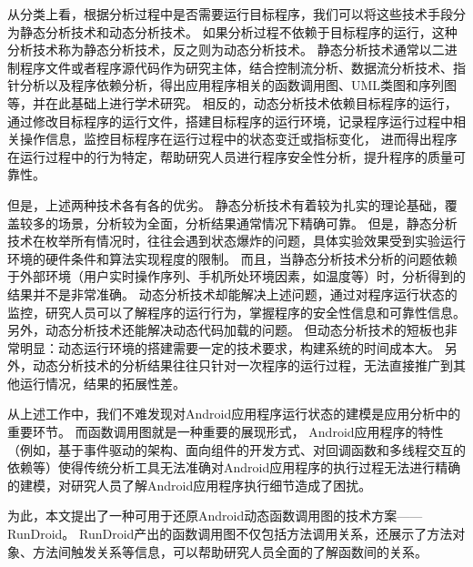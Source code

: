 从分类上看，根据分析过程中是否需要运行目标程序，我们可以将这些技术手段分为静态分析技术和动态分析技术。
如果分析过程不依赖于目标程序的运行，这种分析技术称为静态分析技术，反之则为动态分析技术。
静态分析技术通常以二进制程序文件或者程序源代码作为研究主体，结合控制流分析、数据流分析技术、指针分析以及程序依赖分析，得出应用程序相关的函数调用图、UML类图和序列图等，并在此基础上进行学术研究。
相反的，动态分析技术依赖目标程序的运行，通过修改目标程序的运行文件，搭建目标程序的运行环境，记录程序运行过程中相关操作信息，监控目标程序在运行过程中的状态变迁或指标变化，
进而得出程序在运行过程中的行为特定，帮助研究人员进行程序安全性分析，提升程序的质量可靠性。




但是，上述两种技术各有各的优劣。
静态分析技术有着较为扎实的理论基础，覆盖较多的场景，分析较为全面，分析结果通常情况下精确可靠。
但是，静态分析技术在枚举所有情况时，往往会遇到状态爆炸的问题，具体实验效果受到实验运行环境的硬件条件和算法实现程度的限制。
而且，当静态分析技术分析的问题依赖于外部环境（用户实时操作序列、手机所处环境因素，如温度等）时，分析得到的结果并不是非常准确。
动态分析技术却能解决上述问题，通过对程序运行状态的监控，研究人员可以了解程序的运行行为，掌握程序的安全性信息和可靠性信息。
另外，动态分析技术还能解决动态代码加载的问题。
但动态分析技术的短板也非常明显：动态运行环境的搭建需要一定的技术要求，构建系统的时间成本大。
另外，动态分析技术的分析结果往往只针对一次程序的运行过程，无法直接推广到其他运行情况，结果的拓展性差。



从上述工作中，我们不难发现对Android应用程序运行状态的建模是应用分析中的重要环节。
而函数调用图就是一种重要的展现形式，
Android应用程序的特性（例如，基于事件驱动的架构、面向组件的开发方式、对回调函数和多线程交互的依赖等）使得传统分析工具无法准确对Android应用程序的执行过程无法进行精确的建模，对研究人员了解Android应用程序执行细节造成了困扰。


为此，本文提出了一种可用于还原Android动态函数调用图的技术方案——RunDroid。
RunDroid产出的函数调用图不仅包括方法调用关系，还展示了方法对象、方法间触发关系等信息，可以帮助研究人员全面的了解函数间的关系。



